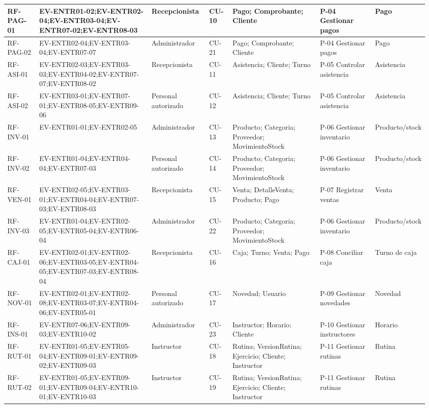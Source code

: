 \begin{landscape}
\begin{longtable}{|p{1.8cm}|p{3.4cm}|p{2.0cm}|p{1.4cm}|p{5.0cm}|p{4.0cm}|p{3.2cm}|}
RF-PAG-01 & EV-ENTR01-02;EV-ENTR02-04;EV-ENTR03-04;EV-ENTR07-02;EV-ENTR08-03 & Recepcionista & CU-10 & Pago; Comprobante; Cliente & P-04 Gestionar pagos & Pago \\ \hline
RF-PAG-02 & EV-ENTR02-04;EV-ENTR03-04;EV-ENTR07-07 & Administrador & CU-21 & Pago; Comprobante; Cliente & P-04 Gestionar pagos & Pago \\ \hline
RF-ASI-01 & EV-ENTR02-03;EV-ENTR03-03;EV-ENTR04-02;EV-ENTR07-07;EV-ENTR08-02 & Recepcionista & CU-11 & Asistencia; Cliente; Turno & P-05 Controlar asistencia & Asistencia \\ \hline
RF-ASI-02 & EV-ENTR03-01;EV-ENTR07-01;EV-ENTR08-05;EV-ENTR09-06 & Personal autorizado & CU-12 & Asistencia; Cliente; Turno & P-05 Controlar asistencia & Asistencia \\ \hline
RF-INV-01 & EV-ENTR01-01;EV-ENTR02-05 & Administrador & CU-13 & Producto; Categoria; Proveedor; MovimientoStock & P-06 Gestionar inventario & Producto/stock \\ \hline
RF-INV-02 & EV-ENTR01-04;EV-ENTR04-04;EV-ENTR07-03 & Personal autorizado & CU-14 & Producto; Categoria; Proveedor; MovimientoStock & P-06 Gestionar inventario & Producto/stock \\ \hline
RF-VEN-01 & EV-ENTR02-05;EV-ENTR03-01;EV-ENTR04-04;EV-ENTR07-03;EV-ENTR08-03 & Recepcionista & CU-15 & Venta; DetalleVenta; Producto; Pago & P-07 Registrar ventas & Venta \\ \hline
RF-INV-03 & EV-ENTR01-04;EV-ENTR02-05;EV-ENTR05-04;EV-ENTR06-04 & Administrador & CU-22 & Producto; Categoria; Proveedor; MovimientoStock & P-06 Gestionar inventario & Producto/stock \\ \hline
RF-CAJ-01 & EV-ENTR02-01;EV-ENTR02-06;EV-ENTR03-05;EV-ENTR04-05;EV-ENTR07-03;EV-ENTR08-04 & Recepcionista & CU-16 & Caja; Turno; Venta; Pago & P-08 Conciliar caja & Turno de caja \\ \hline
RF-NOV-01 & EV-ENTR02-01;EV-ENTR02-08;EV-ENTR03-07;EV-ENTR04-06;EV-ENTR05-01 & Personal autorizado & CU-17 & Novedad; Usuario & P-09 Gestionar novedades & Novedad \\ \hline
RF-INS-01 & EV-ENTR07-06;EV-ENTR09-03;EV-ENTR10-02 & Administrador & CU-23 & Instructor; Horario; Cliente & P-10 Gestionar instructores & Horario \\ \hline
RF-RUT-01 & EV-ENTR01-05;EV-ENTR05-04;EV-ENTR09-01;EV-ENTR09-02;EV-ENTR09-03 & Instructor & CU-18 & Rutina; VersionRutina; Ejercicio; Cliente; Instructor & P-11 Gestionar rutinas & Rutina \\ \hline
RF-RUT-02 & EV-ENTR01-05;EV-ENTR09-01;EV-ENTR09-04;EV-ENTR10-01;EV-ENTR10-03 & Instructor & CU-19 & Rutina; VersionRutina; Ejercicio; Cliente; Instructor & P-11 Gestionar rutinas & Rutina \\ \hline

\end{longtable}
\end{landscape}
